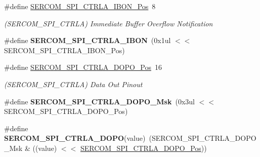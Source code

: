 \begin{DoxyCompactItemize}
\item 
\hypertarget{group___s_a_m_l21___s_e_r_c_o_m_ga63758f686d06f8346066be4217a78f17}{}\#define \hyperlink{group___s_a_m_l21___s_e_r_c_o_m_ga63758f686d06f8346066be4217a78f17}{S\+E\+R\+C\+O\+M\+\_\+\+S\+P\+I\+\_\+\+C\+T\+R\+L\+A\+\_\+\+I\+B\+O\+N\+\_\+\+Pos}~8\label{group___s_a_m_l21___s_e_r_c_o_m_ga63758f686d06f8346066be4217a78f17}

\begin{DoxyCompactList}\small\item\em (S\+E\+R\+C\+O\+M\+\_\+\+S\+P\+I\+\_\+\+C\+T\+R\+L\+A) Immediate Buffer Overflow Notification \end{DoxyCompactList}\item 
\hypertarget{group___s_a_m_l21___s_e_r_c_o_m_ga0f3977bbd89b404668dc1b9ae35edb22}{}\#define {\bfseries S\+E\+R\+C\+O\+M\+\_\+\+S\+P\+I\+\_\+\+C\+T\+R\+L\+A\+\_\+\+I\+B\+O\+N}~(0x1ul $<$$<$ S\+E\+R\+C\+O\+M\+\_\+\+S\+P\+I\+\_\+\+C\+T\+R\+L\+A\+\_\+\+I\+B\+O\+N\+\_\+\+Pos)\label{group___s_a_m_l21___s_e_r_c_o_m_ga0f3977bbd89b404668dc1b9ae35edb22}

\item 
\hypertarget{group___s_a_m_l21___s_e_r_c_o_m_gaa72c7504628951c39d9877c33ab9e6fe}{}\#define \hyperlink{group___s_a_m_l21___s_e_r_c_o_m_gaa72c7504628951c39d9877c33ab9e6fe}{S\+E\+R\+C\+O\+M\+\_\+\+S\+P\+I\+\_\+\+C\+T\+R\+L\+A\+\_\+\+D\+O\+P\+O\+\_\+\+Pos}~16\label{group___s_a_m_l21___s_e_r_c_o_m_gaa72c7504628951c39d9877c33ab9e6fe}

\begin{DoxyCompactList}\small\item\em (S\+E\+R\+C\+O\+M\+\_\+\+S\+P\+I\+\_\+\+C\+T\+R\+L\+A) Data Out Pinout \end{DoxyCompactList}\item 
\hypertarget{group___s_a_m_l21___s_e_r_c_o_m_ga57a54982a3eee52f9eb6f658f025883d}{}\#define {\bfseries S\+E\+R\+C\+O\+M\+\_\+\+S\+P\+I\+\_\+\+C\+T\+R\+L\+A\+\_\+\+D\+O\+P\+O\+\_\+\+Msk}~(0x3ul $<$$<$ S\+E\+R\+C\+O\+M\+\_\+\+S\+P\+I\+\_\+\+C\+T\+R\+L\+A\+\_\+\+D\+O\+P\+O\+\_\+\+Pos)\label{group___s_a_m_l21___s_e_r_c_o_m_ga57a54982a3eee52f9eb6f658f025883d}

\item 
\hypertarget{group___s_a_m_l21___s_e_r_c_o_m_ga811252a3c0a1b19d0b17d903ccef3172}{}\#define {\bfseries S\+E\+R\+C\+O\+M\+\_\+\+S\+P\+I\+\_\+\+C\+T\+R\+L\+A\+\_\+\+D\+O\+P\+O}(value)~(S\+E\+R\+C\+O\+M\+\_\+\+S\+P\+I\+\_\+\+C\+T\+R\+L\+A\+\_\+\+D\+O\+P\+O\+\_\+\+Msk \& ((value) $<$$<$ \hyperlink{group___s_a_m_l21___s_e_r_c_o_m_gaa72c7504628951c39d9877c33ab9e6fe}{S\+E\+R\+C\+O\+M\+\_\+\+S\+P\+I\+\_\+\+C\+T\+R\+L\+A\+\_\+\+D\+O\+P\+O\+\_\+\+Pos}))\label{group___s_a_m_l21___s_e_r_c_o_m_ga811252a3c0a1b19d0b17d903ccef3172}


\end{DoxyCompactItemize}
